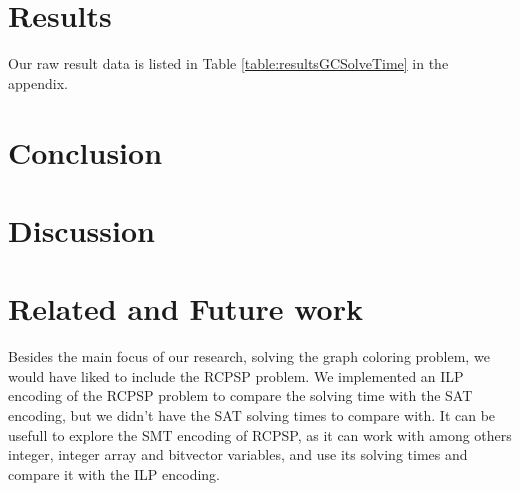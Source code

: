 \documentclass{sig-alternate}
\begin{document}
\section{Results}

Our raw result data is listed in Table \ref{table:resultsGCSolveTime} in the appendix. 

\section{Conclusion}

\section{Discussion}

\section{Related and Future work}
\label{sec:relatedandfuture}
Besides the main focus of our research, solving the graph coloring problem, we would have liked to include
the RCPSP problem.
We implemented an ILP encoding of the RCPSP problem to compare the solving time with the SAT encoding, 
but we didn't have the SAT solving times to compare with. 
It can be usefull to explore the SMT encoding of RCPSP, as it can work with among others integer, 
integer array and bitvector variables, and use its solving times and compare it with the ILP encoding.

\cite{alves2013resource}
\cite{abio2014encoding}
\cite{wu2013exploiting}
\cite{velev2009exploiting}
\cite{horbach2010boolean}
\cite{klein1999computing}
\cite{mingozzi1998exact}
\cite{sharma2011polynomial}
\cite{ramani2004breaking}
\cite{schutt2011explaining}
\cite{wille2008using}
\cite{malaguti2010survey}
\cite{cs395tGCtoSAT}



\end{document}
